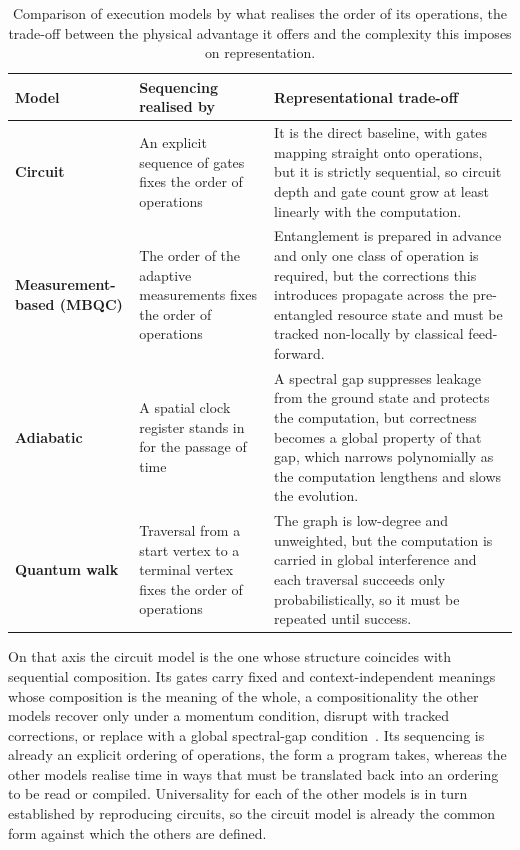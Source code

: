 \begin{table}[htbp]
    \centering
    \caption{Comparison of execution models by what realises the order of its operations, the trade-off between the physical advantage it offers and the complexity this imposes on representation.}
    \label{tab:lit_rev:quantum_programming:execution_models}
    \footnotesize
    \begin{tabularx}{\textwidth}{@{}p{2.0cm}XX@{}}
        \toprule
        \textbf{Model} & \textbf{Sequencing realised by} & \textbf{Representational trade-off} \\
        \midrule
        \textbf{Circuit} & An explicit sequence of gates fixes the order of operations & It is the direct baseline, with gates mapping straight onto operations, but it is strictly sequential, so circuit depth and gate count grow at least linearly with the computation. \\
        \addlinespace
        \textbf{Measurement-based (MBQC)} & The order of the adaptive measurements fixes the order of operations & Entanglement is prepared in advance and only one class of operation is required, but the corrections this introduces propagate across the pre-entangled resource state and must be tracked non-locally by classical feed-forward. \\
        \addlinespace
        \textbf{Adiabatic} & A spatial clock register stands in for the passage of time & A spectral gap suppresses leakage from the ground state and protects the computation, but correctness becomes a global property of that gap, which narrows polynomially as the computation lengthens and slows the evolution. \\
        \addlinespace
        \textbf{Quantum walk} & Traversal from a start vertex to a terminal vertex fixes the order of operations & The graph is low-degree and unweighted, but the computation is carried in global interference and each traversal succeeds only probabilistically, so it must be repeated until success. \\
        \bottomrule
    \end{tabularx}
\end{table}

On that axis the circuit model is the one whose structure coincides with sequential composition.
Its gates carry fixed and context-independent meanings whose composition is the meaning of the whole, a compositionality the other models recover only under a momentum condition, disrupt with tracked corrections, or replace with a global spectral-gap condition~\cite{childs2009quantumwalk,raussendorf2001oneway,aharonov2007adiabatic}.
Its sequencing is already an explicit ordering of operations, the form a program takes, whereas the other models realise time in ways that must be translated back into an ordering to be read or compiled.
Universality for each of the other models is in turn established by reproducing circuits, so the circuit model is already the common form against which the others are defined.

